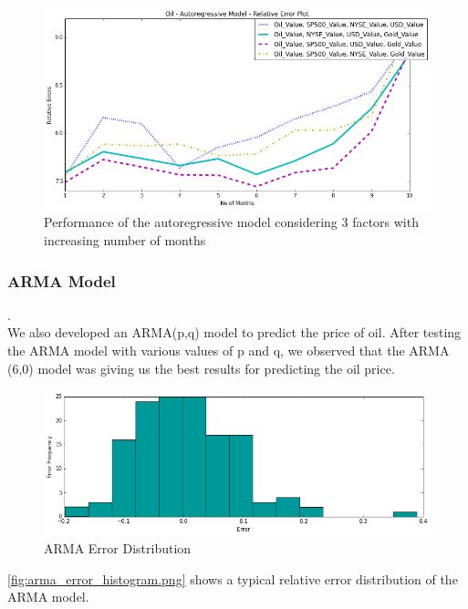 \documentclass[runningheads]{llncs}
\begin{document}
\begin{figure}
\centering
\includegraphics[width=\textwidth]{oil_autoregressive_3factors_10.png}
\caption{Performance of the autoregressive model considering 3 factors with increasing number of months}
\label{fig:oil_autoregressive_3factors_10.png}
\end{figure}

\newpage
\subsubsection {ARMA Model}.\\

\noindent We also developed an ARMA(p,q) model to predict the price of oil. After testing the ARMA model with various values of p and q, we observed that the ARMA (6,0) model was giving us the best results for predicting the oil price.  \\

\begin{figure}
\centering
\includegraphics[width=\textwidth]{arma_error_histogram.png}
\caption{ARMA Error Distribution}
\label{fig:arma_error_histogram.png}
\end{figure}


\noindent \autoref{fig:arma_error_histogram.png} shows a typical relative error distribution of the ARMA model.
\end{document}
